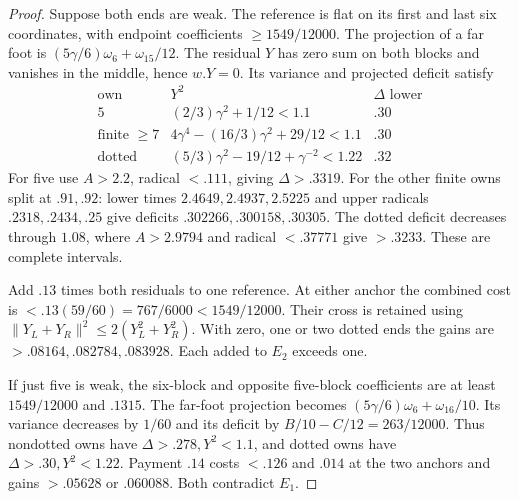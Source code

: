 \documentclass[11pt]{article}
\theoremstyle{definition}
\theoremstyle{remark}
\newcommand{\norm}[1]{\lVert #1\rVert}
\begin{document}
\begin{proof}
Suppose both ends are weak. The reference is flat on its first
and last six coordinates, with endpoint coefficients
$\ge1549/12000$. The projection of a far foot is
$(5\gamma/6)\omega_6+\omega_{15}/12$.
The residual $Y$ has zero sum on both blocks and vanishes in the
middle, hence $w.Y=0$. Its variance and projected deficit satisfy
\[
\begin{array}{c|c|c}
\text{own}&Y^2&\Delta\text{ lower}\\\hline
5&(2/3)\gamma^2+1/12<1.1&.30\\
\text{finite }\ge7&4\gamma^4-(16/3)\gamma^2+29/12<1.1&.30\\
\text{dotted}&(5/3)\gamma^2-19/12+\gamma^{-2}<1.22&.32
\end{array}
\]
For five use $A>2.2$, radical $<.111$, giving $\Delta>.3319$.
For the other finite owns split at $.91,.92$: lower times
$2.4649,2.4937,2.5225$ and upper radicals $.2318,.2434,.25$
give deficits $.302266,.300158,.30305$.
The dotted deficit decreases through $1.08$, where $A>2.9794$
and radical $<.37771$ give $>.3233$. These are complete intervals.

Add $.13$ times both residuals to one reference. At either anchor
the combined cost is $<.13(59/60)=767/6000<1549/12000$.
Their cross is retained using
$\norm{Y_L+Y_R}^2\le2(Y_L^2+Y_R^2)$.
With zero, one or two dotted ends the gains are
$>.08164,.082784,.083928$. Each added to $E_2$ exceeds one.

If just five is weak, the six-block and opposite five-block
coefficients are at least $1549/12000$ and $.1315$.
The far-foot projection becomes
$(5\gamma/6)\omega_6+\omega_{16}/10$.
Its variance decreases by $1/60$ and its deficit by
$B/10-C/12=263/12000$. Thus nondotted owns have
$\Delta>.278,Y^2<1.1$, and dotted owns have
$\Delta>.30,Y^2<1.22$. Payment $.14$ costs $<.126$ and
$.014$ at the two anchors and gains $>.05628$ or $.060088$.
Both contradict $E_1$.


\end{proof}
\end{document}
